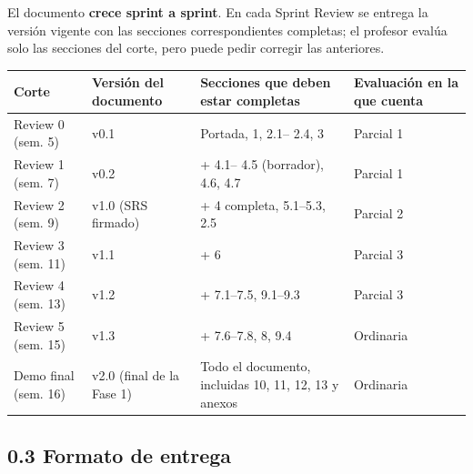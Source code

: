 El documento \textbf{crece sprint a sprint}. En cada Sprint Review se
entrega la versión vigente con las secciones correspondientes completas;
el profesor evalúa solo las secciones del corte, pero puede pedir
corregir las anteriores.

{\def\LTcaptype{none} %
\begin{longtable}[]{@{}
  >{\raggedright\arraybackslash}p{}
  >{\raggedright\arraybackslash}p{}
  >{\raggedright\arraybackslash}p{}
  >{\raggedright\arraybackslash}p{}@{}}
\toprule\noalign{}
\begin{minipage}[b]{\linewidth}\raggedright
\textbf{Corte}
\end{minipage} & \begin{minipage}[b]{\linewidth}\raggedright
\textbf{Versión del documento}
\end{minipage} & \begin{minipage}[b]{\linewidth}\raggedright
\textbf{Secciones que deben estar completas}
\end{minipage} & \begin{minipage}[b]{\linewidth}\raggedright
\textbf{Evaluación en la que cuenta}
\end{minipage} \\
\midrule\noalign{}
\endhead
\bottomrule\noalign{}
\endlastfoot
Review 0 (sem. 5) & v0.1 & Portada, 1, 2.1-- 2.4, 3 & Parcial 1 \\
Review 1 (sem. 7) & v0.2 & + 4.1-- 4.5 (borrador), 4.6, 4.7 & Parcial
1 \\
Review 2 (sem. 9) & v1.0 (SRS firmado) & + 4 completa, 5.1--5.3, 2.5 &
Parcial 2 \\
Review 3 (sem. 11) & v1.1 & + 6 & Parcial 3 \\
Review 4 (sem. 13) & v1.2 & + 7.1--7.5, 9.1--9.3 & Parcial 3 \\
Review 5 (sem. 15) & v1.3 & + 7.6--7.8, 8, 9.4 & Ordinaria \\
Demo final (sem. 16) & v2.0 (final de la Fase 1) & Todo el documento,
incluidas 10, 11, 12, 13 y anexos & Ordinaria \\
\end{longtable}
}

\subsection{0.3 Formato de entrega}\label{formato-de-entrega}

